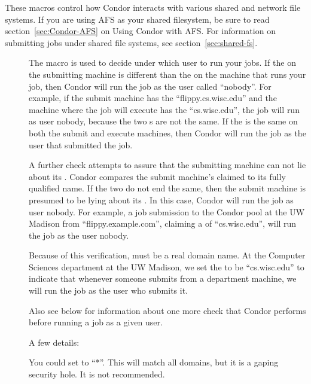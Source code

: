 These macros control how Condor interacts with various shared and
network file systems.  If you are using AFS as your shared filesystem,
be sure to read section~\ref{sec:Condor-AFS} on Using Condor with
AFS.
For information on submitting jobs under shared file systems,
see
section~\ref{sec:shared-fs}.
\begin{description}

\item[] \label{param:UidDomain}
  The  macro
  is used to decide under which user to run your jobs.
  If the 
  on the submitting machine is different than
  the 
  on the machine that runs your job, then Condor will run
  the job as the user called ``nobody''.
  For example, if the submit machine has
  the 
  ``flippy.cs.wisc.edu'' and the machine where the job will execute
  has the 
  ``cs.wisc.edu'', the job will run as user nobody, because
  the two s are not the same.
  If the 
  is the same on both the submit and execute machines,
  then Condor will run the job as the user that submitted the job.

  A further check attempts to assure that the submitting
  machine can not lie about its .
  Condor compares the 
  submit machine's claimed 
  to its fully qualified name.
  If the two do not end the same, then the submit machine
  is presumed to be lying about its .
  In this case, Condor will run the job as user nobody.
  For example, a job submission to the Condor pool at the UW Madison
  from ``flippy.example.com'', claiming a 
  of ``cs.wisc.edu'',
  will run the job as the user nobody.

  Because of this verification,
   must be a real domain name.
  At the Computer Sciences department
  at the UW Madison, we set the 
  to be ``cs.wisc.edu'' to
  indicate that whenever someone submits from a department machine, we
  will run the job as the user who submits it.

  Also see 
  below for information about one more check
  that Condor performs before running a job as a given user.

  A few details:

  You could set 
  to ``*''. This will match all domains,
  but it is a gaping security hole. It is not recommended.


\end{description}
